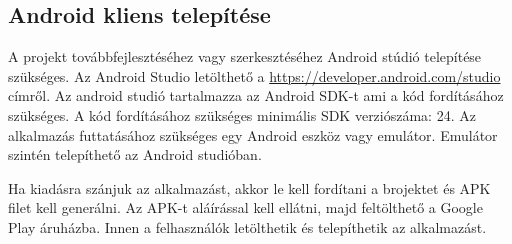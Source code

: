 \subsection{Android kliens telepítése}
A projekt továbbfejlesztéséhez vagy szerkesztéséhez Android stúdió telepítése szükséges. 
Az Android Studio letölthető a \url{https://developer.android.com/studio} címről. 
Az android studió tartalmazza az Android SDK-t ami a kód fordításához szükséges. A kód fordításához szükséges minimális SDK verziószáma: 24.
Az alkalmazás futtatásához szükséges egy Android eszköz vagy emulátor. 
Emulátor szintén telepíthető az Android studióban.

\par
Ha kiadásra szánjuk az alkalmazást, akkor le kell fordítani a brojektet és APK filet kell generálni. 
Az APK-t aláírással kell ellátni, majd feltölthető a Google Play áruházba. 
Innen a felhasználók letölthetik és telepíthetik az alkalmazást.
